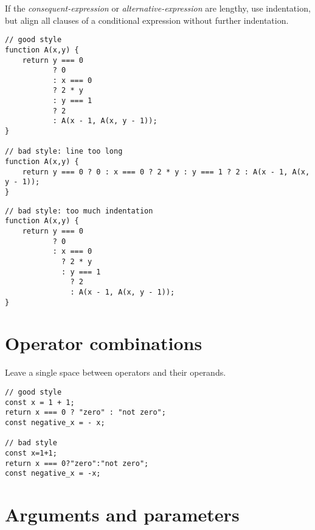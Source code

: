 If the \textit{consequent-expression} or \textit{alternative-expression} are lengthy, use
indentation, but align all clauses of a conditional expression without further indentation.
%
\begin{lstlisting}
// good style
function A(x,y) {
    return y === 0
           ? 0
           : x === 0
           ? 2 * y
           : y === 1
           ? 2
           : A(x - 1, A(x, y - 1));
}

// bad style: line too long
function A(x,y) {
    return y === 0 ? 0 : x === 0 ? 2 * y : y === 1 ? 2 : A(x - 1, A(x, y - 1));
}
\end{lstlisting}
\newpage
\begin{lstlisting}
// bad style: too much indentation
function A(x,y) {
    return y === 0
           ? 0
           : x === 0
             ? 2 * y
             : y === 1
               ? 2
               : A(x - 1, A(x, y - 1));
}
\end{lstlisting}

\vspace{-4mm}

\section*{Operator combinations}

Leave a single space between operators and their operands.
	
\begin{lstlisting}
// good style
const x = 1 + 1;
return x === 0 ? "zero" : "not zero";
const negative_x = - x;

// bad style
const x=1+1;
return x === 0?"zero":"not zero";
const negative_x = -x;
\end{lstlisting}

\vspace{-4mm}

\section*{Arguments and parameters}

